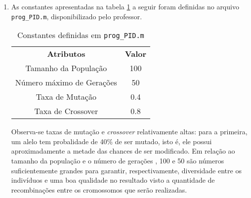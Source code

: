 \begin {enumerate}
  Outra etapa importante para os algoritmos evolutivos é a seleção dos
  indivíduos mais ``adaptados'' ao problema (que possuem maior função de
  \textit{fitness}). Este processo deve garantir que os melhores indivíduos
  persistam, mas não deve ser extremamente radical a fim de garantir uma
  diversidade na população. Um exemplo de um operador de seleção é a técnica de
  \textit{seleção por torneio}. Para selecionar \(N\) indivíduos, realizam-se
  \(N\) torneios com \(p\) participantes, escolhidos aleatoriamente. Quanto mais
  alto é \(p\), maior é a pressão seletiva, isto é, para um indivíduo ruim ser
  escolhido ao menos em um torneio, é necessário que ele compita com \(p-1\)
  indivíduos piores que ele (para \(p\) grande, a probabilidade deste fato
  ocorrer é muito pequena). Cada torneio é vencido pelo indivíduo que apresenta maior
  \textit{fitness}. No caso deste exercício, será realizado apenas um torneio,
  que é composto por 3 indivíduos.

  \item As constantes apresentadas na tabela \ref{tab:pid_constantes} a seguir
  foram definidas no arquivo \texttt{prog\_PID.m}, disponibilizado pelo
  professor.
  
  \begin{table}[h]
	    \centering
		\caption{\label{tab:pid_constantes} Constantes definidas em
		\texttt{prog\_PID.m}}
		\begin{tabular}{|c | c |}
			\hline
			\textbf{Atributos} & \textbf{Valor} \\	\hhline{|=|=|}
			Tamanho da População & 100 \\ \hline 
			Número máximo de Gerações & 50 \\ \hline 
			Taxa de Mutação & 0.4 \\ \hline 			
			Taxa de Crossover & 0.8 \\ \hline 			
		\end{tabular}	    
    \end{table} 
    
    Observa-se taxas de mutação e \textit{crossover} relativamente altas: para a
    primeira, um alelo tem probalidade de 40\% de ser mutado, isto é, ele possui
    aproximadamente a metade das chances de ser modificado. Em relação ao
    tamanho da população e o número de gerações , 100 e 50 são
    números suficientemente grandes para garantir, respectivamente,	 diversidade
    entre os indivíduos e uma boa qualidade no resultado visto a quantidade de
    recombinações entre os cromossomos que serão realizadas.
    

\end{enumerate}
